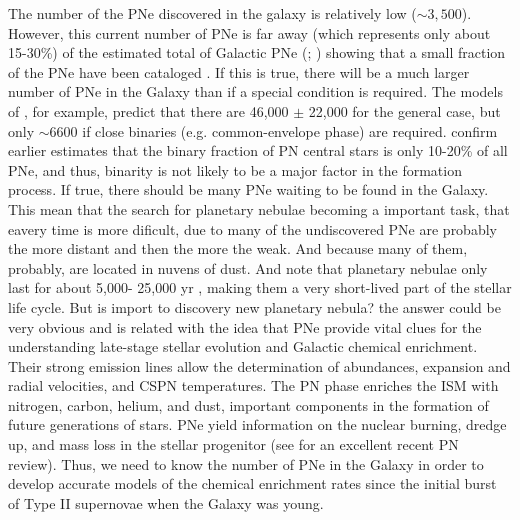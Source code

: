 \documentclass[fleqn,usenatbib]{mnras}
\begin{document}
The number of the PNe discovered in the galaxy is relatively low (\(\sim 3,500\)). However,
this current number of PNe is far away (which represents only about 15-30\%) of the estimated
total of Galactic PNe (\citealp{Frew:2008}; \citealp{Jacoby:2010}) showing that a small fraction
of the PNe have been cataloged \citep{Frew:2017}. If this is true, there will be a much larger
number of PNe in the Galaxy than if a special condition
is required. The models of \citet{Moe:2006}, for
example, predict that there are 46,000 $\pm$ 22,000 for the general case,
but only $\sim$6600 \citep{Marco:2005} if
close binaries (e.g. common-envelope phase) are required.
\citet{Miszalski:2009} confirm earlier estimates that the
binary fraction of PN central stars is only 10-20\% of all
PNe, and thus, binarity is not likely to be a major factor in
the formation process. If true, there should be many PNe
waiting to be found in the Galaxy. This mean that the search for planetary nebulae
becoming a important task, that eavery time is more dificult, due to many of
the undiscovered PNe are probably
the more distant and then the more the weak. And because many of them, probably, are located
in nuvens of dust. And note that planetary nebulae only last for about 5,000-
25,000 yr \citep{Badenes:2015}, making them a very short-lived part of the stellar life cycle.
But is import to discovery new planetary nebula? the answer could be very obvious and is
related with the idea that PNe provide vital clues for the understanding late-stage stellar
evolution and Galactic chemical enrichment. Their strong emission lines allow the determination
of abundances, expansion and radial velocities, and
CSPN temperatures. The PN phase
enriches the ISM with nitrogen, carbon, helium, and dust,
important components in the formation of future generations
of stars. PNe yield information on the nuclear
burning, dredge up, and mass loss in the stellar progenitor
(see \citealp{Kwitter:2022} for an excellent recent PN
review). Thus, we need to know the number of PNe in
the Galaxy in order to develop accurate models of the
chemical enrichment rates since the initial burst of Type II
supernovae when the Galaxy was young.
\end{document}
